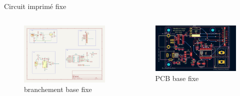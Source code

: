 \documentclass{beamer}
\begin{document}
	\begin{frame}{Circuit imprimé fixe}
		\begin{columns}
			\begin{column}{0.5\textwidth}
				\begin{figure}
					\includegraphics[width=\textwidth]{Image/base fixe.png}
					\caption{branchement base fixe}
				\end{figure}
			\end{column}
			\begin{column}{0.5\textwidth}
				\begin{figure}
					\includegraphics[width=\textwidth]{Image/Base fixe pcb.png}
					\caption{PCB base fixe}
				\end{figure}
			\end{column}
		\end{columns}
	\end{frame}
\end{document}
